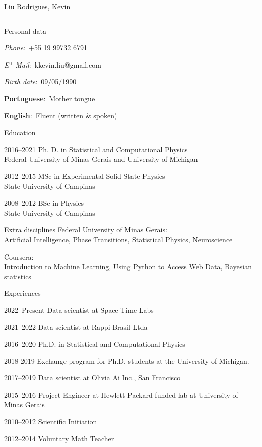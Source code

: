 \documentclass[12pt,a4paper]{article}
\begin{document}
\begin{cv}{Liu Rodrigues, Kevin}
\noindent\rule{\linewidth}{0.4pt}
    \begin{cvlist}{Personal data}
        \item \textit{Phone}:~+55 19 99732 6791
        \item \textit{E"~Mail}:~kkevin.liu@gmail.com
        \item \textit{Birth date}:~09/05/1990
  
        \item \textbf{Portuguese}:~Mother tongue
        \item \textbf{English}:~Fluent (written \& spoken)
    \end{cvlist}
  
  \begin{cvlist}{Education}
    \item[2016--2021] Ph. D. in Statistical and Computational Physics\\
        Federal University of Minas Gerais and University of Michigan
    \item[2012--2015] MSc in Experimental Solid State Physics\\
        State University of Campinas\\
    \item[2008--2012] BSc in Physics\\
        State University of Campinas
    \item[Extra disciplines] Federal University of Minas Gerais:\\
        Artificial Intelligence, Phase Transitions, Statistical Physics, Neuroscience
    \item[] Coursera:\\
        Introduction to Machine Learning, Using Python to Access Web Data, Bayesian statistics
  \end{cvlist}

  \begin{cvlist}{Experiences}
  \item[2022--Present] Data scientist at Space Time Labs
  \item[2021--2022] Data scientist at Rappi Brasil Ltda
  \item[2016--2020] Ph.D. in Statistical and Computational Physics
  \item[2018-2019] Exchange program for Ph.D. students at the University of Michigan.
  \item[2017--2019] Data scientist at Olivia Ai Inc., San Francisco
  \item[2015--2016] Project Engineer at Hewlett Packard funded lab at University of Minas Gerais
  \item[2010--2012] Scientific Initiation
  \item[2012--2014] Voluntary Math Teacher
  \end{cvlist}


\end{cv}
\end{document}
